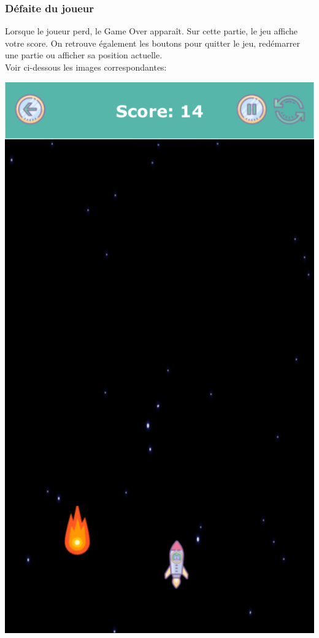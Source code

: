 \documentclass{article}
\begin{document}
\subsubsection{Défaite du joueur}
Lorsque le joueur perd, le Game Over apparaît. Sur cette partie, le jeu affiche votre score. On retrouve également les boutons pour quitter le jeu, redémarrer une partie ou afficher sa position actuelle.\\

Voir ci-dessous les images correspondantes:

\begin{center}
    \includegraphics[scale = 0.18]{images/iOS_3.PNG}

\end{center}
\end{document}
